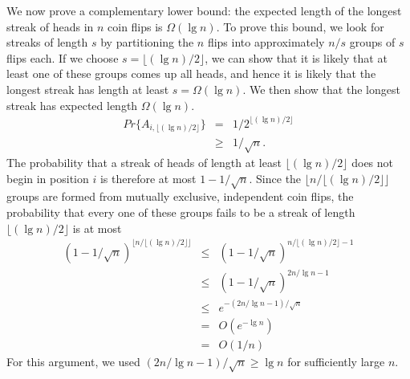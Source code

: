 \documentclass[12pt]{article}
\begin{document}
We now prove a complementary lower bound: the expected length of the longest streak of heads in $n$ coin flips is $\Omega (\lg n)$. To prove this bound, we look for streaks of length $s$ by partitioning the $n$ flips into approximately $n/s$ groups of $s$ flips each. If we choose $s = \lfloor (\lg n)/2 \rfloor$, we can show that it is likely that at least one of these groups comes up all heads, and hence it is likely that the longest streak has length at least $s = \Omega (\lg n)$. We then show that the longest streak has expected length $\Omega (\lg n)$.
\begin{eqnarray*}
  Pr \{ A_{i, \lfloor (\lg n)/2 \rfloor} \}
  &=& 1 / 2^{\lfloor (\lg n)/2 \rfloor} \\
  &\ge& 1 / \sqrt n.
\end{eqnarray*}
The probability that a streak of heads of length at least $\lfloor (\lg n)/2 \rfloor$ does not begin in position $i$ is therefore at most $1 - 1 / \sqrt n$. Since the $\lfloor n / \lfloor (\lg n)/2 \rfloor \rfloor$ groups are formed from mutually exclusive, independent coin flips, the probability that every one of these groups fails to be a streak of length $\lfloor (\lg n)/2 \rfloor$ is at most
\begin{eqnarray*}
  (1 - 1 / \sqrt n)^{\lfloor n/ {\lfloor (\lg n)/2 \rfloor} \rfloor}
  &\le& (1 - 1 / \sqrt n)^{n/ {\lfloor (\lg n)/2 \rfloor} - 1} \\
  &\le& (1 - 1 / \sqrt n)^{2n/ {\lg n} - 1} \\
  &\le& e^{-(2n/ {\lg n} -1)/{\sqrt n}} \\
  &=& O(e^{- \lg n}) \\
  &=& O(1/n)
\end{eqnarray*}
For this argument, we used $(2n / {\lg n} - 1) / {\sqrt n} \ge \lg n$ for sufficiently large $n$. \\
\end{document}
